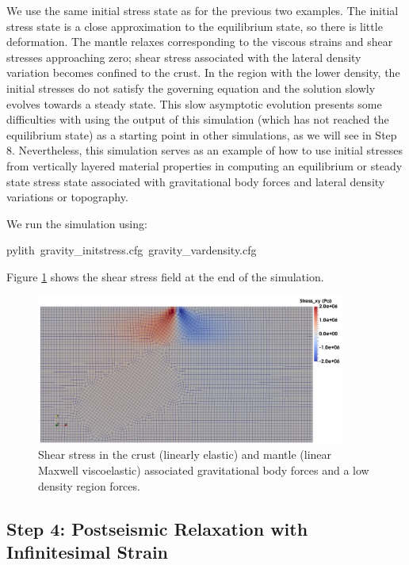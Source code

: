 We use the same initial stress state as for the previous two examples.
The initial stress state is a close approximation to the equilibrium
state, so there is little deformation. The mantle relaxes corresponding
to the viscous strains and shear stresses approaching zero; shear
stress associated with the lateral density variation becomes confined
to the crust. In the region with the lower density, the initial stresses
do not satisfy the governing equation and the solution slowly evolves
towards a steady state. This slow asymptotic evolution presents some
difficulties with using the output of this simulation (which has not
reached the equilibrium state) as a starting point in other simulations,
as we will see in Step 8. Nevertheless, this simulation serves as
an example of how to use initial stresses from vertically layered
material properties in computing an equilibrium or steady state stress
state associated with gravitational body forces and lateral density
variations or topography.

We run the simulation using:
\begin{lyxcode}
pylith~gravity\_initstress.cfg~gravity\_vardensity.cfg
\end{lyxcode}
Figure \ref{fig:examples:gravity:2d:vardensity:stress} shows the
shear stress field at the end of the simulation.

\begin{figure}
\begin{centering}
\includegraphics[width=4in]{tutorials/grav2d/figs/gravity_vardensity-shearstress}
\par\end{centering}

\caption{Shear stress in the crust (linearly elastic) and mantle (linear Maxwell
viscoelastic) associated gravitational body forces and a low density
region forces.\label{fig:examples:gravity:2d:vardensity:stress}}
\end{figure}



\subsection{Step 4: Postseismic Relaxation with Infinitesimal Strain}

